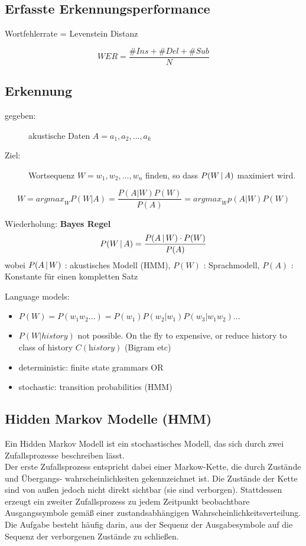 \subsection*{Erfasste Erkennungsperformance}

Wortfehlerrate = Levenstein Distanz

$$WER = \frac{\# Ins + \# Del + \# Sub}{N}$$

\subsection{Erkennung}

\begin{description}
\item[gegeben:] akustische Daten $A = a_1,a_2,\dots,a_k$
\item[Ziel:] Wortsequenz $W = w_1,w_2,\dots,w_n$ finden, so dass $P(W \, | \, A)$ maximiert wird.
\end{description}

$$W = \textit{argmax}_W P(W|A) = \frac{P(A|W) P(W)}{P(A)} = \textit{argmax}_W p(A|W) P(W)$$

Wiederholung: \textbf{Bayes Regel} $$P(W \, | \, A) = \frac{P(A \, | \, W) \cdot P(W)}{P(A)}$$ wobei $P(A \, | \, W)$ : akustisches Modell (HMM), $P(W)$ : Sprachmodell, $P(A)$ : Konstante für einen kompletten Satz

Language models:
\begin{itemize}
	\item $P(W) = P(w_1 w_2 ...) = P(w_1) P(w_2|w_1) P(w_3|w_1w_2)...$
	\item $P(W|history)$ not possible. On the fly to expensive, or reduce history to class of history $C(\textit{history})$ (Bigram etc)
	\item deterministic: finite state grammars OR
	\item stochastic: transition probabilities (HMM)
\end{itemize}

\subsection{Hidden Markov Modelle (HMM)}

Ein Hidden Markov Modell ist ein stochastisches Modell, das sich durch zwei Zufallsprozesse beschreiben lässt. \\
Der erste Zufallsprozess entspricht dabei einer Markow-Kette, die durch Zustände und Übergangs- wahrscheinlichkeiten gekennzeichnet ist. Die Zustände der Kette sind von außen jedoch nicht direkt sichtbar (sie sind verborgen). Stattdessen erzeugt ein zweiter Zufallsprozess zu jedem Zeitpunkt beobachtbare Ausgangssymbole gemäß einer zustandsabhängigen Wahrscheinlichkeitsverteilung. Die Aufgabe besteht häufig darin, aus der Sequenz der Ausgabesymbole auf die Sequenz der verborgenen Zustände zu schließen.


